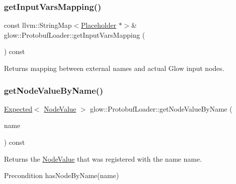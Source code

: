\subsubsection{\texorpdfstring{get\+Input\+Vars\+Mapping()}{getInputVarsMapping()}}
{\footnotesize\ttfamily const llvm\+::\+String\+Map$<$\hyperlink{classglow_1_1_placeholder}{Placeholder} $\ast$$>$\& glow\+::\+Protobuf\+Loader\+::get\+Input\+Vars\+Mapping (\begin{DoxyParamCaption}{ }\end{DoxyParamCaption}) const\hspace{0.3cm}{\ttfamily [inline]}}

\begin{DoxyReturn}{Returns}
mapping between external names and actual Glow input nodes. 
\end{DoxyReturn}
\mbox{\label{classglow_1_1_protobuf_loader_afe06768b43d8aa8398d8d4c0c9668540}} 
\subsubsection{\texorpdfstring{get\+Node\+Value\+By\+Name()}{getNodeValueByName()}}
{\footnotesize\ttfamily \hyperlink{classglow_1_1detail_1_1_glow_expected}{Expected}$<$ \hyperlink{structglow_1_1_node_value}{Node\+Value} $>$ glow\+::\+Protobuf\+Loader\+::get\+Node\+Value\+By\+Name (\begin{DoxyParamCaption}\item[{llvm\+::\+String\+Ref}]{name }\end{DoxyParamCaption}) const}

\begin{DoxyReturn}{Returns}
the \hyperlink{structglow_1_1_node_value}{Node\+Value} that was registered with the name {\ttfamily name}. 
\end{DoxyReturn}
\begin{DoxyPrecond}{Precondition}
has\+Node\+By\+Name(name) 
\end{DoxyPrecond}
\mbox{\label{classglow_1_1_protobuf_loader_ac558da9000f7c4cf499e2b4862827e5c}} 
